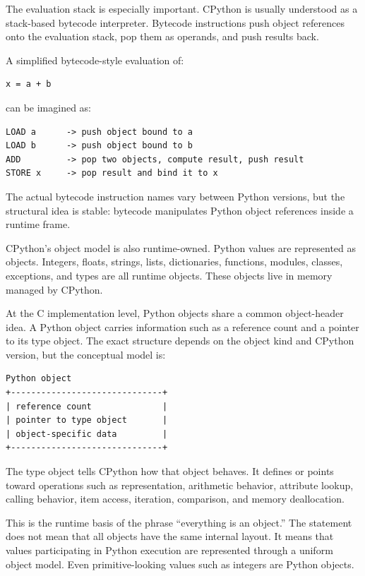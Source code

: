 The evaluation stack is especially important. CPython is usually understood as a stack-based bytecode interpreter. Bytecode instructions push object references onto the evaluation stack, pop them as operands, and push results back.

A simplified bytecode-style evaluation of:

\begin{verbatim}
x = a + b
\end{verbatim}

can be imagined as:

\begin{verbatim}
LOAD a      -> push object bound to a
LOAD b      -> push object bound to b
ADD         -> pop two objects, compute result, push result
STORE x     -> pop result and bind it to x
\end{verbatim}

The actual bytecode instruction names vary between Python versions, but the structural idea is stable: bytecode manipulates Python object references inside a runtime frame.

CPython's object model is also runtime-owned. Python values are represented as objects. Integers, floats, strings, lists, dictionaries, functions, modules, classes, exceptions, and types are all runtime objects. These objects live in memory managed by CPython.

At the C implementation level, Python objects share a common object-header idea. A Python object carries information such as a reference count and a pointer to its type object. The exact structure depends on the object kind and CPython version, but the conceptual model is:

\begin{verbatim}
Python object
+------------------------------+
| reference count              |
| pointer to type object       |
| object-specific data         |
+------------------------------+
\end{verbatim}

The type object tells CPython how that object behaves. It defines or points toward operations such as representation, arithmetic behavior, attribute lookup, calling behavior, item access, iteration, comparison, and memory deallocation.

This is the runtime basis of the phrase ``everything is an object.'' The statement does not mean that all objects have the same internal layout. It means that values participating in Python execution are represented through a uniform object model. Even primitive-looking values such as integers are Python objects.

